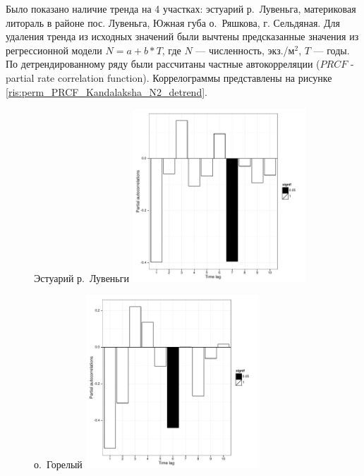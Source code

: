Было показано наличие тренда на 4 участках: эстуарий р.~Лувеньга, материковая литораль в районе пос. Лувеньга, Южная губа о.~Ряшкова, г. Сельдяная.
Для удаления тренда из исходных значений были вычтены предсказанные значения из регрессионной модели $N = a + b*T$, где $N$ --- численность, экз./м$^2$, $T$ --- годы.
По детрендированному ряду были рассчитаны частные автокорреляции ($PRCF$ - partial rate correlation function).  
Коррелограммы представлены на рисунке \ref{ris:perm_PRCF_Kandalaksha_N2_detrend}.
	\begin{figure}[p]
	
	\begin{minipage}[b]{.46\linewidth}
	\begin{center}
	{\footnotesize Эстуарий р.~Лувеньги}
		\includegraphics[width=65mm]{../White_Sea/dynamic_N_N1/perm_PRCF_Estuary_detrend.pdf}

	\end{center}
	\end{minipage}
		\hfil %
	\begin{minipage}[b]{.46\linewidth}
	\begin{center}
	{\footnotesize о.~Горелый}
		\includegraphics[width=65mm]{../White_Sea/dynamic_N_N1/perm_PRCF_Goreliy_all_detrend.pdf}
	\end{center}
	\end{minipage}


\end{figure}
